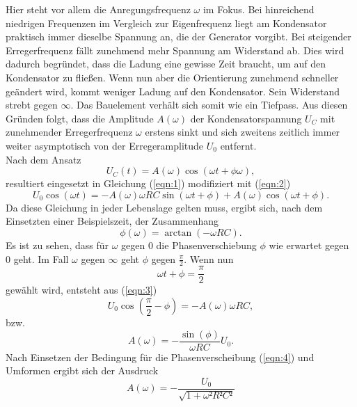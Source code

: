Hier steht vor allem die Anregungsfrequenz $\omega$ im Fokus.
Bei hinreichend niedrigen Frequenzen im Vergleich zur Eigenfrequenz liegt am Kondensator praktisch immer dieselbe Spannung an, die der Generator vorgibt.
Bei steigender Erregerfrequenz fällt zunehmend mehr Spannung am Widerstand ab.
Dies wird dadurch begründet, dass die Ladung eine gewisse Zeit braucht, um auf den Kondensator zu fließen.
Wenn nun aber die Orientierung zunehmend schneller geändert wird, kommt weniger Ladung auf den Kondensator.
Sein Widerstand strebt gegen $\infty$.
Das Bauelement verhält sich somit wie ein Tiefpass.
Aus diesen Gründen folgt, dass die Amplitude $A(\omega)$ der Kondensatorspannung $U_C$ mit zunehmender Erregerfrequenz $\omega$ erstens sinkt und sich zweitens zeitlich immer weiter asymptotisch von der Erregeramplitude $U_0$ entfernt.\\
Nach dem Ansatz
\begin{equation}
  U_C(t) = A(\omega)\cos(\omega t+\phi{\omega}),
\end{equation}
resultiert eingesetzt in Gleichung (\ref{eqn:1}) modifiziert mit (\ref{eqn:2})
\begin{equation}
  U_0\cos(\omega t) = -A(\omega)\omega RC\sin(\omega t + \phi) + A(\omega)\cos(\omega t+\phi). \label{eqn:3}
\end{equation}
Da diese Gleichung in jeder Lebenslage gelten muss, ergibt sich, nach dem Einsetzten einer Beispielszeit, der Zusammenhang
\begin{equation}
  \phi(\omega) = \arctan(-\omega RC). \label{eqn:4}
\end{equation}
Es ist zu sehen, dass für $\omega$ gegen $0$ die Phasenverschiebung $\phi$ wie erwartet gegen $0$ geht.
Im Fall $\omega$ gegen $\infty$ geht $\phi$ gegen $\frac{\pi}{2}$.
Wenn nun
\begin{equation}
  \omega t + \phi = \frac{\pi}{2}
\end{equation}
gewählt wird, entsteht aus (\ref{eqn:3})
\begin{equation}
  U_0\cos(\frac{\pi}{2} - \phi) = -A(\omega)\omega RC,
\end{equation}
bzw.
\begin{equation}
  A(\omega) = -\frac{\sin(\phi)}{\omega RC}U_0.
\end{equation}
Nach Einsetzen der Bedingung für die Phasenverscheibung (\ref{eqn:4}) und Umformen ergibt sich der Ausdruck
\begin{equation}
  A(\omega) = -\frac{U_0}{\sqrt{1+\omega²R²C²}} \label{fuck1}
\end{equation}
